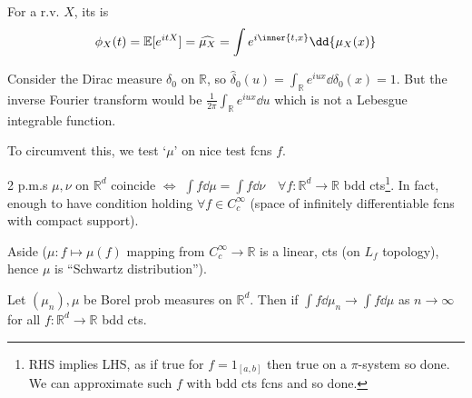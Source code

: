 \begin{definition}
	For a r.v. $X$, its  is
	\begin{align*}
		\phi_X(t) = \mathbb{E}[e^{itX}] = \widehat{\mu_X} = \int e^{i \inner{t, x}} \dd{\mu_X(x)}
	\end{align*}
\end{definition}

\begin{example}
	Consider the Dirac measure $\delta_0$ on $\mathbb R$, so $\hat \delta_0(u) = \int_{\mathbb R} e^{iux} \dd{\delta_0(x)} = 1$.
	But the inverse Fourier transform would be $\frac{1}{2\pi} \int_{\mathbb R} e^{iux} \dd{u}$ which is not a Lebesgue integrable function.
\end{example}

To circumvent this, we test `$\mu$' on nice test fcns $f$.

\begin{remark}
	2 p.m.s $\mu, \nu$ on $\mathbb{R}^d$ coincide $\iff$ $\int f \dd{\mu} = \int f \dd{\nu} \quad \forall f : \mathbb{R}^d \to \mathbb{R}$ bdd cts\footnote{RHS implies LHS, as if true for $f = 1_{[a, b]}$ then true on a $\pi$-system so done. We can approximate such $f$ with bdd cts fcns and so done.}.
	In fact, enough to have condition holding $\forall f \in C_c^\infty$ (space of infinitely differentiable fcns with compact support).
\end{remark}

\begin{aside}{Aside}
	($\mu : f \mapsto \mu(f)$ mapping from $C_c^\infty \to \mathbb{R}$ is a linear, cts (on $L_f$ topology), hence $\mu$ is ``Schwartz distribution'').

\end{aside}

\begin{definition}
	Let $(\mu_n), \mu$ be Borel prob measures on $\mathbb{R}^d$.
	Then  if $\int f \dd{\mu_n} \to \int f \dd{\mu}$ as $n \to \infty$ for all $f : \mathbb{R}^d \to \mathbb{R}$ bdd cts.
\end{definition}

